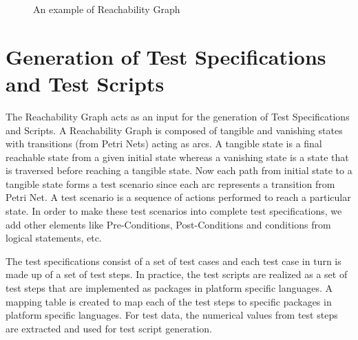 \begin{figure}[htb!]
\centering
{}
\caption{An example of Reachability Graph}
\label{fig:rgexp}
\end{figure}

\section{Generation of Test Specifications and Test Scripts}
The Reachability Graph acts as an input for the generation of Test Specifications and Scripts. A Reachability Graph is composed of tangible and vanishing states with transitions (from Petri Nets) acting as arcs. A tangible state is a final reachable state from a given initial state whereas a vanishing state is a state that is traversed before reaching a tangible state. Now each path from initial state to a tangible state forms a test scenario since each arc represents a transition from Petri Net. A test scenario is a sequence of actions performed to reach a particular state. In order to make these test scenarios into complete test specifications, we add other elements like Pre-Conditions, Post-Conditions and conditions from logical statements, etc. 

The test specifications consist of a set of test cases and each test case in turn is made up of a set of test steps. In practice, the test scripts are realized as a set of test steps that are implemented as packages in platform specific languages. A mapping table is created to map each of the test steps to specific packages in platform specific languages. For test data, the numerical values from test steps are extracted and used for test script generation.





